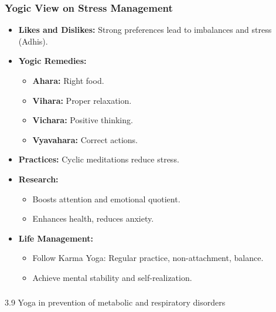 \begin{frame}[fragile]\frametitle{Yogic View on Stress Management}

    \begin{itemize}
        \item \textbf{Likes and Dislikes:} 
        Strong preferences lead to imbalances and stress (Adhis).
        \item \textbf{Yogic Remedies:}
        \begin{itemize}
            \item \textbf{Ahara:} Right food.
            \item \textbf{Vihara:} Proper relaxation.
            \item \textbf{Vichara:} Positive thinking.
            \item \textbf{Vyavahara:} Correct actions.
        \end{itemize}
        \item \textbf{Practices:} 
        Cyclic meditations reduce stress.
        \item \textbf{Research:} 
        \begin{itemize}
            \item Boosts attention and emotional quotient.
            \item Enhances health, reduces anxiety.
        \end{itemize}
        \item \textbf{Life Management:}
        \begin{itemize}
            \item Follow Karma Yoga: Regular practice, non-attachment, balance.
            \item Achieve mental stability and self-realization.
        \end{itemize}
    \end{itemize}

\end{frame}

\begin{frame}[fragile]\frametitle{}
\begin{center}
{\Large 3.9 Yoga in prevention of metabolic and respiratory disorders}
\end{center}
\end{frame}

